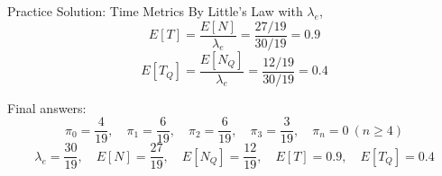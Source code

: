 \documentclass[10pt,aspectratio=169]{beamer}
\begin{document}
\begin{frame}{Practice Solution: Time Metrics}
By Little's Law with \(\lambda_e\),
\[
\boxed{E[T]=\frac{E[N]}{\lambda_e}
=\frac{27/19}{30/19}
=0.9}
\]
\[
\boxed{E[T_Q]=\frac{E[N_Q]}{\lambda_e}
=\frac{12/19}{30/19}
=0.4}
\]

\vspace{0.2cm}
Final answers:
\[
\boxed{
\pi_0=\frac{4}{19},\quad
\pi_1=\frac{6}{19},\quad
\pi_2=\frac{6}{19},\quad
\pi_3=\frac{3}{19},\quad
\pi_n=0\ (n\geq 4)
}
\]
\[
\boxed{
\lambda_e=\frac{30}{19},\quad
E[N]=\frac{27}{19},\quad
E[N_Q]=\frac{12}{19},\quad
E[T]=0.9,\quad
E[T_Q]=0.4
}
\]
\end{frame}
\end{document}
